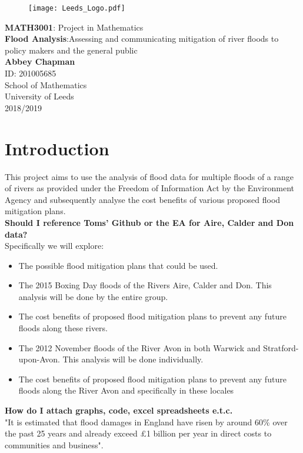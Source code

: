 \documentclass[11 pt, a4paper]{article}
\begin{document}
\begin{titlepage}
\begin{center}

\begin{figure}[H]
\centering
\texttt{[image: Leeds\_Logo.pdf]}
\end{figure}

\vspace{4cm}
{\LARGE \textbf{MATH3001}: Project in Mathematics}\\

\vspace{1cm}
{\Huge \textbf{Flood Analysis}:Assessing and communicating mitigation of river floods to policy makers and the general public}\\
\vspace{5cm}
\textbf{Abbey Chapman}\\
ID: 201005685\\
\vfill
School of Mathematics\\
University of Leeds\\
2018/2019
\end{center}
\end{titlepage}

\tableofcontents 
\noindent \hrulefill

\newpage
\section{Introduction}
This project aims to use the analysis of flood data for multiple floods of a range of rivers as provided under the Freedom of Information Act by the Environment Agency and subsequently analyse the cost benefits of various proposed flood mitigation plans. \\
\textbf{Should I reference Toms' Github or the EA for Aire, Calder and Don data?}\\
Specifically we will explore:\\

\begin{framed}
\begin{itemize}
\item The possible flood mitigation plans that could be used.
\item The 2015 Boxing Day floods of the Rivers Aire, Calder and Don. This analysis will be done by the entire group.
\item The cost benefits of proposed flood mitigation plans to prevent any future floods along these rivers.
\item The 2012 November floods of the River Avon in both Warwick and Stratford-upon-Avon. This analysis will be done individually.
\item The cost benefits of proposed flood mitigation plans to prevent any future floods along the River Avon and specifically in these locales
\end{itemize}
\end{framed}
\textbf{How do I attach graphs, code, excel spreadsheets e.t.c.}\\
"It is estimated that flood damages in England have risen by around 60\% over the past 25 years and already exceed £1 billion per year in direct costs to communities and business".\cite{2}
\end{document}
